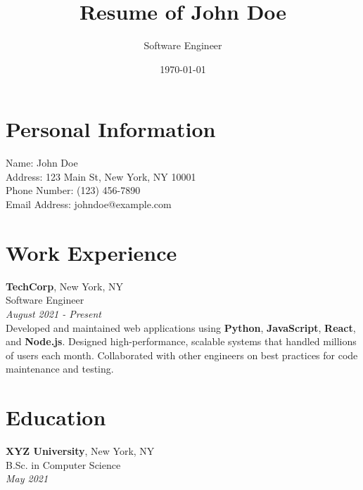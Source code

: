 \documentclass[11pt]{article}
\title{Resume of \textbf{John Doe}}
\author{Software Engineer}
\date{\today}
\begin{document}
\maketitle

\section*{Personal Information}
Name: John Doe\\
Address: 123 Main St, New York, NY 10001\\
Phone Number: (123) 456-7890\\
Email Address: johndoe@example.com

\section*{Work Experience}
\textbf{TechCorp}, New York, NY \\
Software Engineer \\
\textit{August 2021 - Present} \\

Developed and maintained web applications using \textbf{Python}, \textbf{JavaScript}, \textbf{React}, and \textbf{Node.js}. Designed high-performance, scalable systems that handled millions of users each month. Collaborated with other engineers on best practices for code maintenance and testing.

\section*{Education}
\textbf{XYZ University}, New York, NY \\
B.Sc. in Computer Science \\
\textit{May 2021}
\end{document}
